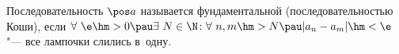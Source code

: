 \label{pk}
    Последовательность $\pos a$ называется фундаментальной (последовательностью Коши), если
    $\forall\  \e\hm>0\pau \exists\  N\in\N\colon \forall\  n,m\hm>N\pau |a_n-a_m|\hm<\e$ "--- все лампочки слились в~одну.
